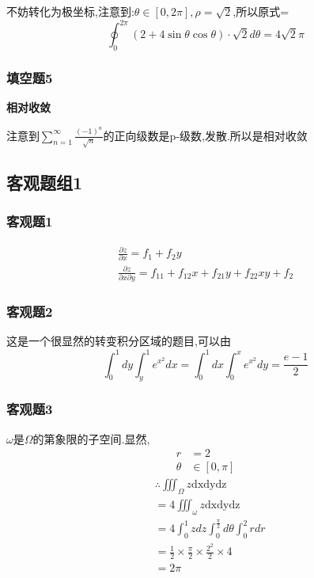 \documentclass[a4paper,12pt]{ctexrep}
\begin{document}
不妨转化为极坐标,注意到:$\theta\in[0,2\pi],\rho=\sqrt{2}$,所以原式=\begin{equation*}
	\oint_{0}^{2\pi}\left(2+4\sin\theta\cos\theta\right)\cdot\sqrt{2}d\theta = 4 \sqrt{2} \pi
\end{equation*}

\subsubsection{填空题5}
\textbf{相对收敛}

注意到$\sum_{n=1}^{\infty}{\frac{(-1)^{n}}{\sqrt{n}}}$的正向级数是p-级数,发散.所以是相对收敛

\newpage

\subsection{客观题组1}
\subsubsection{客观题1}
\begin{eqnarray*}
	\frac{\partial z}{\partial x}=f_{1}+f_{2}y \\
	\frac{\partial z}{\partial x\partial y}=f_{11}+f_{12}x+f_{21}y+f_{22}xy+f_{2}
\end{eqnarray*}

\subsubsection{客观题2}
这是一个很显然的转变积分区域的题目,可以由\begin{equation*}
	\int_{0}^{1}dy\int_{y}^{1}e^{x^{2}}dx
	=\int_{0}^{1}dx\int_{0}^{x}e^{x^{2}}dy
	=\frac{e - 1}{2}
\end{equation*}

\subsubsection{客观题3}
\setcounter{counter1}{1}
$\omega$是$\Omega$的第象限的子空间.显然,$$\begin{aligned}r&=2\\\theta&\in[0,\pi]\end{aligned}$$
\begin{equation*}
	 \begin{aligned}& \therefore \iiint_{\Omega}z\mathrm{dxdydz} \\&
 =4\iiint_{\omega}z\mathrm{dxdydz} \\&
 =4\int_{0}^{1}zdz\int_{0}^{\frac{\pi}{2}}d\theta\int_{0}^{2}rdr\\&
	=\frac{1}{2}\times\frac{\pi}{2}\times\frac{2^{2}}{2}\times4\\&
	=2\pi\end{aligned}
\end{equation*}
\end{document}
